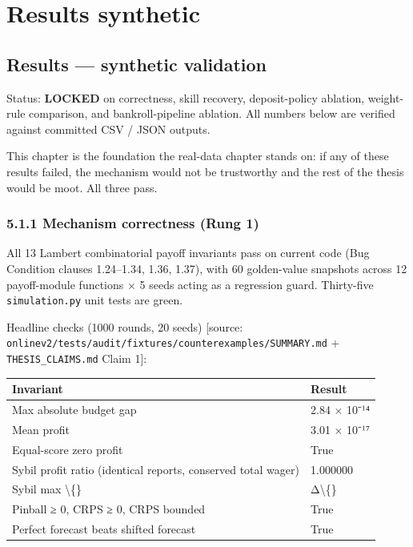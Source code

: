 \documentclass[11pt,a4paper,openany]{report}
\begin{document}
\part*{Results synthetic}
\chapter{Results — synthetic validation}

Status: \textbf{LOCKED} on correctness, skill recovery, deposit-policy
ablation, weight-rule comparison, and bankroll-pipeline ablation. All
numbers below are verified against committed CSV / JSON outputs.

This chapter is the foundation the real-data chapter stands on: if any
of these results failed, the mechanism would not be trustworthy and the
rest of the thesis would be moot. All three pass.

\section{5.1.1 Mechanism correctness (Rung 1)}

All 13 Lambert combinatorial payoff invariants pass on current code
(Bug Condition clauses 1.24–1.34, 1.36, 1.37), with 60 golden-value
snapshots across 12 payoff-module functions × 5 seeds acting as a
regression guard. Thirty-five \texttt{simulation.py} unit tests are green.

Headline checks (1000 rounds, 20 seeds)
[source: \texttt{onlinev2/tests/audit/fixtures/counterexamples/SUMMARY.md} +
\texttt{THESIS\_CLAIMS.md} Claim 1]:

\begin{center}
\small
\begin{tabular}{ll}
\toprule
\textbf{Invariant} & \textbf{Result} \\
\midrule
Max absolute budget gap & 2.84 × 10⁻¹⁴ \\
Mean profit & 3.01 × 10⁻¹⁷ \\
Equal-score zero profit & True \\
Sybil profit ratio (identical reports, conserved total wager) & 1.000000 \\
Sybil max \textbackslash\{\} & Δ\textbackslash\{\} \\
Pinball ≥ 0, CRPS ≥ 0, CRPS bounded & True \\
Perfect forecast beats shifted forecast & True \\
\bottomrule
\end{tabular}
\end{center}
\end{document}
